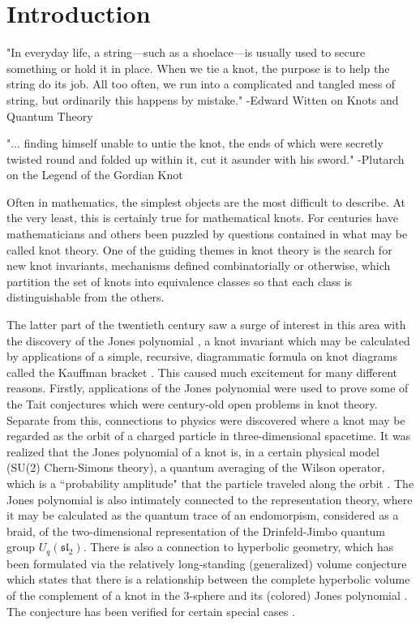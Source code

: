 \chapter{Introduction}

"In everyday life, a string—such as a shoelace—is usually used to secure something or hold it in place. When we tie a knot, the purpose is to help the string do its job. All too often, we run into a complicated and tangled mess of string, but ordinarily this happens by mistake." -Edward Witten on Knots and Quantum Theory

"... finding himself unable to untie the knot, the ends of which were secretly twisted round and folded up within it, cut it asunder with his sword." -Plutarch on the Legend of the Gordian Knot


Often in mathematics, the simplest objects are the most difficult to describe. At the very least, this is certainly true for mathematical knots. For centuries have mathematicians and others been puzzled by questions contained in what may be called knot theory. One of the guiding themes in knot theory is the search for new knot invariants, mechanisms defined combinatorially or otherwise, which partition the set of knots into equivalence classes so that each class is distinguishable from the others. 

The latter part of the twentieth century saw a surge of interest in this area with the discovery of the Jones polynomial \cite{Jon85}, a knot invariant which may be calculated by applications of a simple, recursive, diagrammatic formula on knot diagrams called the Kauffman bracket \cite{Kau87}. This caused much excitement for many different reasons. Firstly, applications of the Jones polynomial were used to prove some of the Tait conjectures \cite{Kau87, Thi88} which were century-old open problems in knot theory. Separate from this, connections to physics were discovered where a knot may be regarded as the orbit of a charged particle in three-dimensional spacetime. It was realized that the Jones polynomial of a knot is, in a certain physical model (SU(2) Chern-Simons theory), a quantum averaging of the Wilson operator, which is a ``probability amplitude" that the particle traveled along the orbit \cite{Wit89}. The Jones polynomial is also intimately connected to the representation theory, where it may be calculated as the quantum trace of an endomorpism, considered as a braid, of the two-dimensional representation of the Drinfeld-Jimbo quantum group $U_q(\mathfrak{sl}_2)$. There is also a connection to hyperbolic geometry, which has been formulated via the relatively long-standing (generalized) volume conjecture which states that there is a relationship between the complete hyperbolic volume of the complement of a knot in the $3$-sphere and its (colored) Jones polynomial \cite{Hik07}. The conjecture has been verified for certain special cases \cite{KT00}. 

